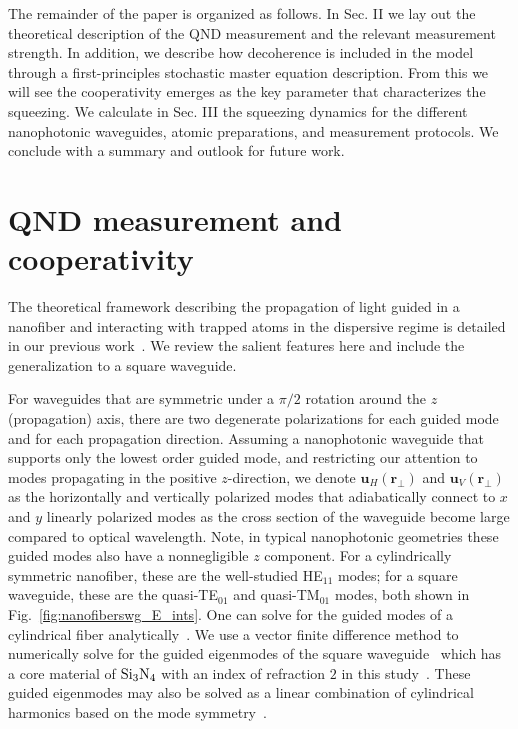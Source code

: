 \documentclass[preprint,aps,pra,onecolumn,superscriptaddress]{revtex4-1} %
\newcommand{\mbf}[1]{\mathbf{#1}}
\begin{document}
The remainder of the paper is organized as follows.  In Sec. II we lay out the theoretical description of the QND measurement and the relevant measurement strength.  In addition, we describe how decoherence is included in the model through a first-principles stochastic master equation description.  From this we will see the cooperativity emerges as the key parameter that characterizes the squeezing.  We calculate in Sec. III the squeezing dynamics for the different nanophotonic waveguides, atomic preparations, and measurement protocols.  We conclude with a summary and outlook for future work.


\section{QND measurement and cooperativity} \label{Sec::QNDandCooperativityTheory}
The theoretical framework describing the propagation of light guided in a nanofiber and interacting with trapped atoms in the dispersive regime is detailed in our previous work~\cite{Qi2016}.  We review the salient features here and include the generalization to a square waveguide.

For waveguides that are symmetric under a $\pi/2$ rotation around the $z$ (propagation) axis, there are two degenerate polarizations for each guided mode and for each propagation direction.  Assuming a nanophotonic waveguide that supports only the lowest order guided mode, and restricting our attention to modes propagating in the positive $z$-direction, we denote $\mbf{u}_H(\mbf{r}_\perp)$ and  $\mbf{u}_V(\mbf{r}_\perp)$ as the horizontally and vertically polarized modes that adiabatically connect to $x$ and $y$ linearly polarized modes as the cross section of the waveguide become large compared to optical wavelength.  Note, in typical nanophotonic geometries these guided modes also have a nonnegligible $z$ component.  For a cylindrically symmetric nanofiber, these are the well-studied HE$_{11}$ modes; for a square waveguide, these are the quasi-TE$_{01}$ and quasi-TM$_{01}$ modes, both shown in Fig.~\eqref{fig:nanofiberswg_E_ints}. One can solve for the guided modes of a cylindrical fiber analytically~\cite{Kien2004,Vetsch2010Opticala,Qi2016}. We use a vector finite difference method to numerically solve for the guided eigenmodes of the square waveguide~\cite{Fallahkhair2008} which has a core material of $ \rm{Si}_3\rm{N}_4 $ with an index of refraction $ 2 $ in this study~\cite{Lee2013}. These guided eigenmodes may also be solved as a linear combination of cylindrical harmonics based on the mode symmetry~\cite{Pavlovic2010Dispersion}.
\end{document}
